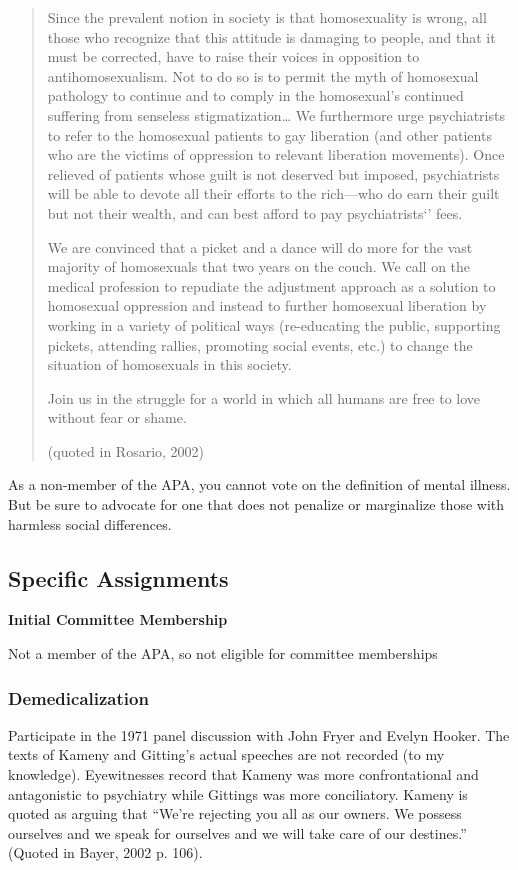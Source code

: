 \begin{refsection}
\begin{quote}
Since the prevalent notion in society is that homosexuality is wrong, all those who recognize that this attitude is damaging to people, and that it must be corrected, have to raise their voices in opposition to antihomosexualism. Not to do so is to permit the myth of homosexual pathology to continue and to comply in the homosexual's continued suffering from senseless stigmatization{\ldots} We furthermore urge psychiatrists to refer to the homosexual patients to gay liberation (and other patients who are the victims of oppression to relevant liberation movements). Once relieved of patients whose guilt is not deserved but imposed, psychiatrists will be able to devote all their efforts to the rich—who do earn their guilt but not their wealth, and can best afford to pay psychiatrists`' fees.

We are convinced that a picket and a dance will do more for the vast majority of homosexuals that two years on the couch. We call on the medical profession to repudiate the adjustment approach as a solution to homosexual oppression and instead to further homosexual liberation by working in a variety of political ways (re-educating the public, supporting pickets, attending rallies, promoting social events, etc.) to change the situation of homosexuals in this society.

Join us in the struggle for a world in which all humans are free to love without fear or shame.

(quoted in Rosario, 2002)
\end{quote}

As a non-member of the APA, you cannot vote on the definition of mental illness. But be sure to advocate for one that does not penalize or marginalize those with harmless social differences.

\subsection{Specific Assignments}
\label{specificassignments}

\textbf{Initial Committee Membership}

Not a member of the APA, so not eligible for committee memberships

\subsubsection{Demedicalization}
\label{demedicalization}

Participate in the 1971 panel discussion with John Fryer and Evelyn Hooker. The texts of Kameny and Gitting's actual speeches are not recorded (to my knowledge). Eyewitnesses record that Kameny was more confrontational and antagonistic to psychiatry while Gittings was more conciliatory. Kameny is quoted as arguing that “We're rejecting you all as our owners. We possess ourselves and we speak for ourselves and we will take care of our destines.” (Quoted in Bayer, 2002 p. 106).


\end{refsection}

